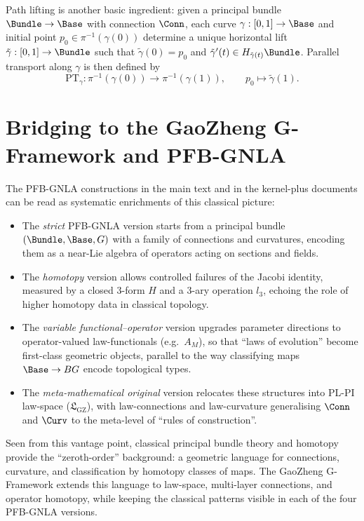 \documentclass[11pt]{book}
\theoremstyle{plain}
\theoremstyle{definition}
\newcommand{\GZLS}{\ensuremath{\mathfrak{L}_{\mathrm{GZ}}}}       \newcommand{\GZLT}{\ensuremath{M_{!w}}}                           \newcommand{\GZLOC}{\ensuremath{A_M}}                             \newcommand{\GZLCurv}{\ensuremath{\mathcal{F}_{\mathrm{law}}}}
\begin{document}
Path lifting is another basic ingredient: given a principal bundle
$\Bundle\to\Base$ with connection $\Conn$, each curve
$\gamma:[0,1]\to\Base$ and initial point $p_0\in\pi^{-1}(\gamma(0))$
determine a unique horizontal lift
$\tilde\gamma:[0,1]\to\Bundle$ such that
$\tilde\gamma(0)=p_0$ and $\tilde\gamma'(t)\in H_{\tilde\gamma(t)}\Bundle$.
Parallel transport along $\gamma$ is then defined by
\[
  \mathrm{PT}_\gamma:\pi^{-1}(\gamma(0))\to\pi^{-1}(\gamma(1)),
  \qquad
  p_0\mapsto \tilde\gamma(1).
\]



\section{Bridging to the GaoZheng G-Framework and PFB-GNLA}


The PFB-GNLA constructions in the main text and in the kernel-plus
documents can be read as systematic enrichments of this classical
picture:

\begin{itemize}
  \item The \emph{strict} PFB-GNLA version starts from a principal
        bundle $(\Bundle,\Base,G)$ with a family of connections and
        curvatures, encoding them as a near-Lie algebra of operators
        acting on sections and fields.
\item The \emph{homotopy} version allows controlled failures of the
        Jacobi identity, measured by a closed 3-form $H$ and a
        3-ary operation $l_3$, echoing the role of higher homotopy
        data in classical topology.
\item The \emph{variable functional--operator} version upgrades
        parameter directions to operator-valued law-functionals
        (e.g.\ $A_M$), so that “laws of evolution” become first-class
        geometric objects, parallel to the way classifying maps
        $\Base\to BG$ encode topological types.
\item The \emph{meta-mathematical original} version relocates these
        structures into PL-PI law-space (\GZLS), with law-connections
        and law-curvature generalising $\Conn$ and $\Curv$ to the
        meta-level of “rules of construction”.
\end{itemize}

Seen from this vantage point, classical principal bundle theory and
homotopy provide the “zeroth-order” background: a geometric language
for connections, curvature, and classification by homotopy classes of
maps. The GaoZheng G-Framework extends this language to law-space,
multi-layer connections, and operator homotopy, while keeping the
classical patterns visible in each of the four PFB-GNLA versions.
\end{document}
